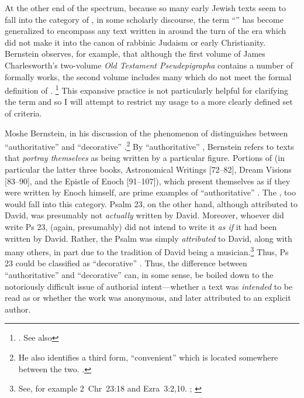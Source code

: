 At the other end of the spectrum, because so many early Jewish texts seem to fall into the category of \psa, in some scholarly discourse, the term ``\psa'' has become generalized to encompass any text written in around the turn of the era which did not make it into the canon of rabbinic Judaism or early Christianity. Bernstein observes, for example, that although the first volume of James Charlesworth's two-volume \emph{Old Testament Pseudepigrapha} contains a number of formally \psgraphic works, the second volume includes many which do not meet the formal definition of \psa.%
%
\footnote{\cite[2]{bernstein_chazon-etal1999}. See also }
%
This expansive practice is not particularly helpful for clarifying the term and so I will attempt to restrict my usage to a more clearly defined set of criteria.

Moshe Bernstein, in his discussion of the phenomenon of \psy distinguishes between ``authoritative'' \psy and ``decorative'' \psy.\footnote{He also identifies a third form, ``convenient'' \psy which is located somewhere between the two. \cite[3--7]{bernstein_chazon-etal1999}.} By ``authoritative'' \psy, Bernstein refers to texts that \emph{portray themselves} as being written by a particular figure. Portions of \firstenoch (in particular the latter three books, Astronomical Writings [72--82], Dream Visions [83--90], and the Epistle of Enoch [91--107]), which present themselves as if they were written by Enoch himself, are prime examples of ``authoritative'' \psy. The \ga, too would fall into this category. Psalm 23, on the other hand, although attributed to David, was presumably not \emph{actually} written by David. Moreover, whoever did write Ps 23, (again, presumably) did not intend to write it \emph{as if} it had been written by David. Rather, the Psalm was simply \emph{attributed} to David, along with many others, in part due to the tradition of David being a musician.\footnote{See, for example 2~Chr~23:18 and Ezra~3:2,10. \cite{mays_interpretation1986}; \cite{sarna_stein-loewe1979}} Thus, Ps 23 could be classified as ``decorative'' \psy. Thus, the difference between ``authoritative'' and ``decorative'' \psy can, in some sense, be boiled down to the notoriously difficult issue of authorial intent---whether a text was \emph{intended} to be read as \psa or whether the work was anonymous, and later attributed to an explicit author.

